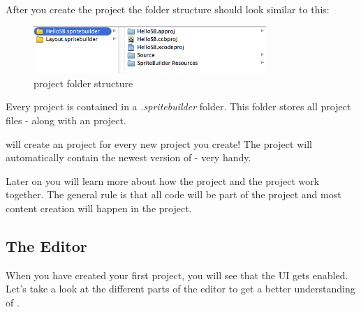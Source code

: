 After you create the project the folder structure should look similar
to this:
\begin{figure}[H]
		\centering
		\includegraphics[width=250pt]{images/cocos2d/setup/project_structure.png}     
		\caption{\SB{} project folder structure}
\end{figure}

Every \SB{} project is contained in a \textit{.spritebuilder} folder. This
folder stores all \SB{} project files - along with an \xcode{} project. 

\begin{details} 
\SB{} will create an \xcode{} project for every new project you create! The
\xcode{} project will automatically contain the newest version of \cocos{} -
very handy.
\end{details}

Later on you will learn more about how the \SB{} project and the \xcode{}
project work together. The general rule is that all code will be part of the
\xcode{} project and most content creation will happen in the \SB{} project.

\subsection{The Editor}
When you have created your first \SB{} project, you will see that the \SB{} UI
gets enabled. Let's take a look at the different parts of the editor to get a
better understanding of \SB{}.

